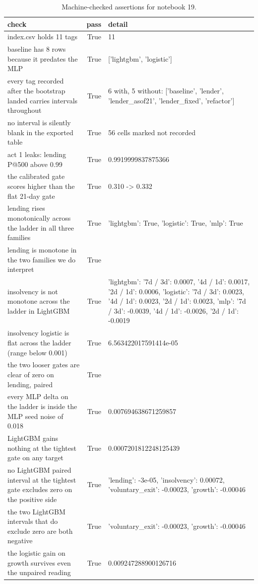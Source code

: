 \begin{table}
\caption{Machine-checked assertions for notebook 19.}
\label{tab:19_checks}
\begin{tabular}{lrl}
\toprule
check & pass & detail \\
\midrule
index.csv holds 11 tags & True & 11 \\
baseline has 8 rows because it predates the MLP & True & ['lightgbm', 'logistic'] \\
every tag recorded after the bootstrap landed carries intervals throughout & True & 6 with, 5 without: ['baseline', 'lender', 'lender_asof21', 'lender_fixed', 'refactor'] \\
no interval is silently blank in the exported table & True & 56 cells marked not recorded \\
act 1 leaks: lending P@500 above 0.99 & True & 0.9919999837875366 \\
the calibrated gate scores higher than the flat 21-day gate & True & 0.310 -> 0.332 \\
lending rises monotonically across the ladder in all three families & True & {'lightgbm': True, 'logistic': True, 'mlp': True} \\
lending is monotone in the two families we do interpret & True &  \\
insolvency is not monotone across the ladder in LightGBM & True & {'lightgbm': {'7d / 3d': 0.0007, '4d / 1d': 0.0017, '2d / 1d': 0.0006}, 'logistic': {'7d / 3d': 0.0023, '4d / 1d': 0.0023, '2d / 1d': 0.0023}, 'mlp': {'7d / 3d': -0.0039, '4d / 1d': -0.0026, '2d / 1d': -0.0019}} \\
insolvency logistic is flat across the ladder (range below 0.001) & True & 6.563422017591414e-05 \\
the two looser gates are clear of zero on lending, paired & True &  \\
every MLP delta on the ladder is inside the MLP seed noise of 0.018 & True & 0.007694638671259857 \\
LightGBM gains nothing at the tightest gate on any target & True & 0.0007201812248125439 \\
no LightGBM paired interval at the tightest gate excludes zero on the positive side & True & {'lending': -3e-05, 'insolvency': 0.00072, 'voluntary_exit': -0.00023, 'growth': -0.00046} \\
the two LightGBM intervals that do exclude zero are both negative & True & {'voluntary_exit': -0.00023, 'growth': -0.00046} \\
the logistic gain on growth survives even the unpaired reading & True & 0.009247288900126716 \\

\end{tabular}
\end{table}

